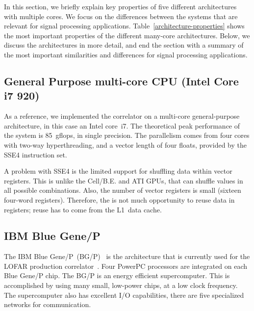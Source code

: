 \documentclass{article}
\begin{document}
In this section, we briefly explain key properties of five different
architectures with multiple cores.  We focus on the differences
between the systems that are relevant for signal processing
applications. Table~\ref{architecture-properties} shows the most
important properties of the different many-core architectures. Below,
we discuss the architectures in more detail, and end the section with
a summary of the most important similarities and differences for signal processing applications.


\subsection{General Purpose multi-core CPU (Intel Core i7 920)}

As a reference, we implemented the correlator on a multi-core
general-purpose architecture, in this case an Intel core~i7.  The
theoretical peak performance of the system is 85~gflops, in single
precision.  The parallelism comes from four cores with two-way
hyperthreading, and a vector length of four floats, provided by the
SSE4 instruction set.

A problem with SSE4 is the
limited support for shuffling data within vector registers. This is unlike the
Cell/B.E. and ATI GPUs, that can shuffle values in all possible combinations.
Also, the number of vector registers is small (sixteen four-word
registers).  Therefore, the is not much opportunity to reuse data in
registers; reuse has to come from the L1~data cache. 

\subsection{IBM Blue Gene/P}

The IBM Blue Gene/P~(BG/P)~\cite{IBM:08} is the architecture that is
currently used for the LOFAR production correlator~\cite{Romein:09b}.
Four PowerPC processors are integrated on each Blue Gene/P chip.
The BG/P is an energy efficient supercomputer.
This is accomplished by using many small, low-power chips, at a low clock
frequency.
The supercomputer also has excellent I/O capabilities, there are five
specialized networks for communication.
\end{document}
